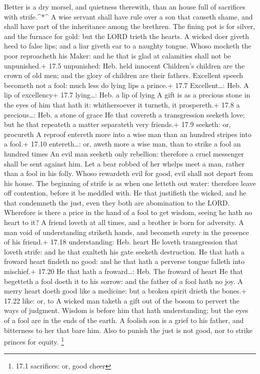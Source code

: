  Better is a dry morsel, and quietness therewith, than an
house full of sacrifices with strife.\^{}*\^{}  A wise
servant shall have rule over a son that causeth shame, and shall have
part of the inheritance among the brethren.  The fining pot
is for silver, and the furnace for gold: but the LORD trieth the hearts.
 A wicked doer giveth heed to false lips; and a liar giveth
ear to a naughty tongue.  Whoso mocketh the poor reproacheth
his Maker: and he that is glad at calamities shall not be unpunished.+
17.5 unpunished: Heb. held innocent  Children's children are
the crown of old men; and the glory of children are their fathers.
 Excellent speech becometh not a fool: much less do lying
lips a prince.+ 17.7 Excellent\ldots: Heb. A lip of excellency+ 17.7
lying\ldots: Heb. a lip of lying  A gift is as a precious
stone in the eyes of him that hath it: whithersoever it turneth, it
prospereth.+ 17.8 a precious\ldots: Heb. a stone of grace 
He that covereth a transgression seeketh love; but he that repeateth a
matter separateth very friends.+ 17.9 seeketh: or, procureth
 A reproof entereth more into a wise man than an hundred
stripes into a fool.+ 17.10 entereth\ldots: or, aweth more a wise man,
than to strike a fool an hundred times  An evil man seeketh
only rebellion: therefore a cruel messenger shall be sent against him.
 Let a bear robbed of her whelps meet a man, rather than a
fool in his folly.  Whoso rewardeth evil for good, evil
shall not depart from his house.  The beginning of strife
is as when one letteth out water: therefore leave off contention, before
it be meddled with.  He that justifieth the wicked, and he
that condemneth the just, even they both are abomination to the LORD.
 Wherefore is there a price in the hand of a fool to get
wisdom, seeing he hath no heart to it?  A friend loveth at
all times, and a brother is born for adversity.  A man void
of understanding striketh hands, and becometh surety in the presence of
his friend.+ 17.18 understanding: Heb. heart  He loveth
transgression that loveth strife: and he that exalteth his gate seeketh
destruction.  He that hath a froward heart findeth no good:
and he that hath a perverse tongue falleth into mischief.+ 17.20 He that
hath a froward\ldots: Heb. The froward of heart  He that
begetteth a fool doeth it to his sorrow: and the father of a fool hath
no joy.  A merry heart doeth good like a medicine: but a
broken spirit drieth the bones.+ 17.22 like: or, to  A
wicked man taketh a gift out of the bosom to pervert the ways of
judgment.  Wisdom is before him that hath understanding;
but the eyes of a fool are in the ends of the earth.  A
foolish son is a grief to his father, and bitterness to her that bare
him.  Also to punish the just is not good, nor to strike
princes for equity. \footnote{17.1 sacrifices: or, good cheer}

